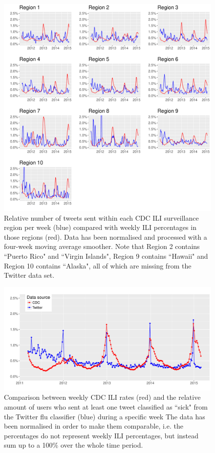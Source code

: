\documentclass[11pt, a4paper,twoside]{report}\usepackage[]{graphicx}\usepackage[]{color}
\begin{document}
\begin{figure}[H]
\centering
\includegraphics[width=1\linewidth]{29_cdc_twitter_comp_regs_ma4.pdf}
\caption{Relative number of tweets sent within each CDC ILI surveillance region per week (blue) compared with weekly ILI percentages in those regions (red). Data has been normalised and processed with a four-week moving average smoother. Note that Region 2 contains ``Puerto Rico" and ``Virgin Islands", Region 9 contains ``Hawaii" and Region 10 contains ``Alaska", all of which are missing from the Twitter data set.}
\label{fig:cdc_tw_comp_regs_ma4}
\end{figure}

\begin{figure}[H]
  \includegraphics[width=1\linewidth]{30_cdc_twitter_comp_nat_ma1_user.pdf}
  \caption{}
  \caption{Comparison between weekly CDC ILI rates (red) and the relative amount of users who sent at least one tweet classified as ``sick" from the Twitter flu classifier (blue) during a specific week The data has been normalised in order to make them comparable, i.e. the percentages do not represent weekly ILI percentages, but instead sum up to a 100\% over the whole time period.}
    \label{fig:cdc_tw_comp_nat_user_ma1}
\end{figure}
\end{document}
